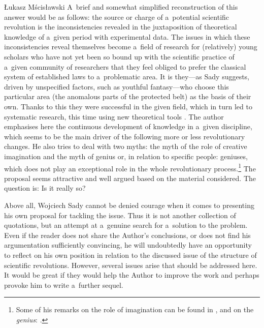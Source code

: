 \begin{newrevengenv}{Łukasz Mścisławski}
A~brief and somewhat simplified reconstruction of this answer would be as follows: the source or charge of a~potential scientific revolution is the inconsistencies revealed in the juxtaposition of theoretical knowledge of a~given period with experimental data. The issues in which these inconsistencies reveal themselves become a~field of research for (relatively) young scholars who have not yet been so bound up with the scientific practice of a~given community of researchers that they feel obliged to prefer the classical system of established laws to a~problematic area. It is they---as Sady suggests, driven by unspecified factors, such as youthful fantasy---who choose this particular area (the anomalous parts of the protected belt) as the basis of their own. Thanks to this they were successful in the given field, which in turn led to systematic research, this time using new theoretical tools
\parencite[cf.][pp.217--219]{sady_struktura_2020}. %
 The author emphasises here the continuous development of knowledge in a~given discipline, which seems to be the main driver of the following more or less revolutionary changes. He also tries to deal with two myths: the myth of the role of creative imagination and the myth of genius or, in relation to specific people: geniuses, which does not play an exceptional role in the whole revolutionary process.\footnote{Some of his remarks on the role of imagination can be found in 
\parencite[][pp.31--34, 71--78]{sady_struktura_2020}, %
 and on the \textit{genius}: 
\parencite[][pp.219--220]{sady_struktura_2020}.%
} The proposal seems attractive and well argued based on the material considered. The question is: Is it really so?

Above all, Wojciech Sady cannot be denied courage when it comes to presenting his own proposal for tackling the issue. Thus it is not another collection of quotations, but an attempt at a~genuine search for a~solution to the problem. Even if the reader does not share the Author's conclusions, or does not find his argumentation sufficiently convincing, he will undoubtedly have an opportunity to reflect on his own position in relation to the discussed issue of the structure of scientific revolutions. However, several issues arise that should be addressed here. It would be great if they would help the Author to improve the work and perhaps provoke him to write a~further sequel.


\end{newrevengenv}
